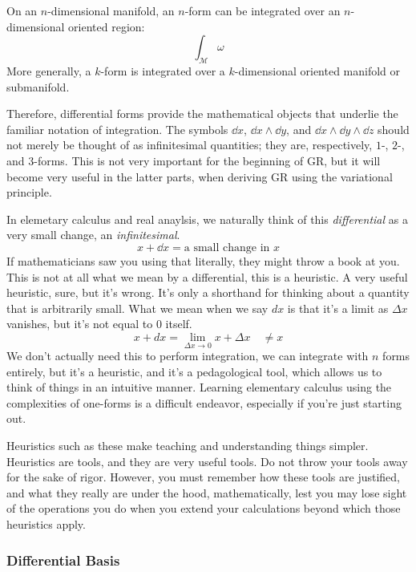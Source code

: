 		On an $n$-dimensional manifold, an $n$-form can be integrated over an
		$n$-dimensional oriented region:
		\[
			\int_{\mathcal M}\omega
		\]
		More generally, a $k$-form is integrated over a $k$-dimensional oriented
		manifold or submanifold.

		Therefore, differential forms provide the mathematical objects that
		underlie the familiar notation of integration. The symbols $\dd{x}$,
		$\dd{x}\wedge\dd{y}$, and
		$\dd{x}\wedge\dd{y}\wedge\dd{z}$ should not merely be thought of as
		infinitesimal quantities; they are, respectively, $1$-, $2$-, and
		$3$-forms.
		This is not very important for the beginning of GR, but it will become
		very useful in the latter parts, when deriving GR using the variational principle.

		In elemetary calculus and real anaylsis, we naturally think of this \textit{differential} as a very small change, an \textit{infinitesimal}. 
		\[
			x + \dd{x} = \text{a small change in }x
		\]
		If mathematicians saw you using that literally, they might throw a book at you. This is not at all what 
		we mean by a differential, this is a heuristic. A very useful heuristic, sure, but it's wrong.
		It's only a shorthand for thinking about a quantity that is arbitrarily small. What we mean when we say $dx$ is that it's a limit as $\Delta x$ vanishes,
		but it's not equal to $0$ itself.
		\[
			x + dx = \lim_{\Delta x \to 0} x + \Delta x \quad \neq x
		\]
		We don't actually need this to perform integration, we can integrate with $n$ forms entirely, but it's a heuristic, and
		it's a pedagological tool, which allows us to think of things in an intuitive manner.
		Learning elementary calculus using the complexities of one-forms is a
		difficult endeavor, especially if you're just starting out. 


		Heuristics such as these make teaching and understanding things simpler.
		Heuristics are tools, and they are very useful tools. Do not throw your tools away for
		the sake of rigor. However, you must remember how these tools are justified, and what they
		really are under the hood, mathematically, lest you may lose sight of the operations you do when you extend 
		your calculations beyond which those heuristics apply.

	\subsubsection{Differential Basis}

